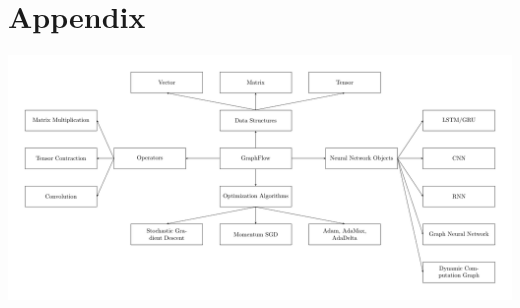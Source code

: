 \documentclass[a4paper]{article}
\begin{document}
\clearpage

\section{Appendix}

\begin{center}
\includegraphics[scale=0.56]{GraphFlow_box_flow}
\end{center}

\end{document}
